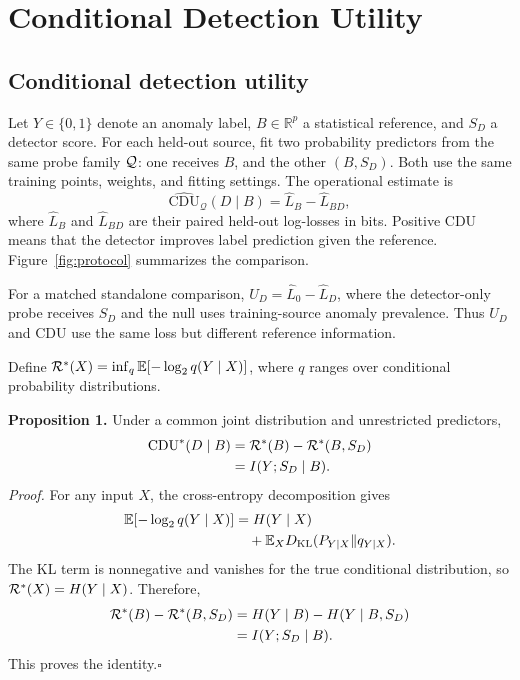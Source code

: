\section{Conditional Detection Utility}
\subsection{Conditional detection utility}
Let $Y\in\{0,1\}$ denote an anomaly label, $B\in\mathbb R^p$ a statistical reference, and $S_D$ a detector score. For each held-out source, fit two probability predictors from the same probe family $\mathcal{Q}$: one receives $B$, and the other $(B,S_D)$. Both use the same training points, weights, and fitting settings. The operational estimate is
\begin{equation}
\widehat{\mathrm{CDU}}_{\mathcal Q}(D\mid B)=\widehat L_B-\widehat L_{BD},
\label{eq:cdu}
\end{equation}
where $\widehat L_B$ and $\widehat L_{BD}$ are their paired held-out log-losses in bits. Positive CDU means that the detector improves label prediction given the reference. Figure~\ref{fig:protocol} summarizes the comparison.

For a matched standalone comparison, $U_D=\widehat L_0-\widehat L_D$, where the detector-only probe receives $S_D$ and the null uses training-source anomaly prevalence. Thus $U_D$ and CDU use the same loss but different reference information.

Define $\mathcal{R}^*(X)=\inf_q\mathbb{E}[-\log_2 q(Y\mid X)]$, where $q$ ranges over conditional probability distributions.\par\noindent\textbf{Proposition 1.} Under a common joint distribution and unrestricted predictors,
\begin{equation}
\begin{aligned}
\operatorname{CDU}^*(D\mid B)&=\mathcal{R}^*(B)-\mathcal{R}^*(B,S_D)\\
&=I(Y;S_D\mid B).
\end{aligned}
\end{equation}
\noindent\textit{Proof.} For any input $X$, the cross-entropy decomposition gives
\begin{equation}
\begin{aligned}
\mathbb{E}[-\log_2 q(Y\mid X)]&=H(Y\mid X)\\
&\quad+\mathbb{E}_X D_{\rm KL}(P_{Y\mid X}\Vert q_{Y\mid X}).
\end{aligned}
\end{equation}
The KL term is nonnegative and vanishes for the true conditional distribution, so $\mathcal{R}^*(X)=H(Y\mid X)$. Therefore,
\begin{equation}
\begin{aligned}
\mathcal{R}^*(B)-\mathcal{R}^*(B,S_D)
&=H(Y\mid B)-H(Y\mid B,S_D)\\
&=I(Y;S_D\mid B).
\end{aligned}
\end{equation}
This proves the identity.\hfill$\square$

